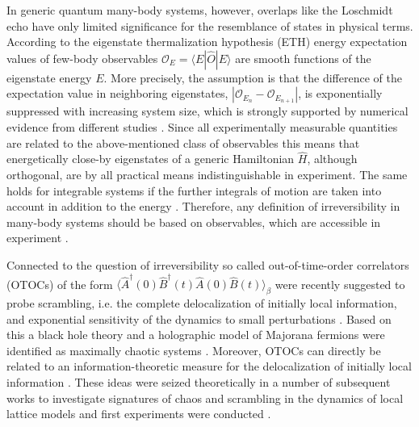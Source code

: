 \documentclass[%
 reprint,
unsortedaddress,
 amsmath,amssymb,
 prl,
]{revtex4-1}
\begin{document}
In generic quantum many-body systems, however, overlaps like the Loschmidt echo have only
limited significance for the resemblance of states in physical terms. According to the
eigenstate thermalization hypothesis (ETH) \cite{Deutsch1991,Srednicki1994,Srednicki1996,Rigol2008} 
energy expectation values of few-body observables 
$\mathcal O_E=\langle E|\hat O|E\rangle$ are smooth functions of the eigenstate energy $E$. 
More precisely, the assumption is that the difference of the expectation value in neighboring eigenstates, 
$|\mathcal O_{E_n}-\mathcal O_{E_{n+1}}|$, is exponentially suppressed with increasing
system size, which is strongly supported by numerical evidence from different studies 
\cite{Steinigeweg2013,Beugeling2014,Kim2014,Mondaini2016}.
Since all experimentally measurable quantities are related to the above-mentioned class of observables 
this means that energetically
close-by eigenstates of a generic Hamiltonian $\hat H$, although orthogonal, 
are by all practical means indistinguishable in experiment. 
The same holds for
integrable systems if the further integrals of motion are taken into account in addition to the energy 
\cite{Cassidy2011}. Therefore, any definition of irreversibility in many-body systems should be
based on observables, which are accessible in experiment \citep{Levstein1998,Usaj1998,Fine2014,Zangara2015,Elsayed2015,Schmitt2016,Fine2017}. 

Connected to the question of irreversibility 
so called out-of-time-order correlators (OTOCs) of the form $\langle \hat A^\dagger(0)\hat B^\dagger(t)\hat A(0)\hat B(t)\rangle_\beta$ were recently suggested to probe scrambling, i.e. the
complete delocalization of initially local information, and exponential sensitivity of the dynamics to small
perturbations \cite{Shenker2014,Kitaev2014}. Based on this a black hole
theory and a holographic model of Majorana fermions were identified as maximally chaotic systems \cite{Maldacena2016,Kitaev2015,Maldacena2016a}. Moreover, OTOCs can directly be related to an information-theoretic 
measure for the delocalization of initially local information \cite{Hosur2016}.
These ideas were seized theoretically in a number of subsequent works to investigate signatures of 
chaos and scrambling in the dynamics of local lattice models 
\cite{Hosur2016,Bohrdt2016,Roberts2016,Iyoda2017,Swingle2016,Shen2016,Huang2016,Patel2017,vonKeyserlingk2017,Rakovszky2017,He2017,Lin2018,Bordia2018,Khemani2018,Nahum2018} and first experiments were conducted \cite{Garttner2017,Li2017,Meier2017,Wei2018}.
\end{document}
